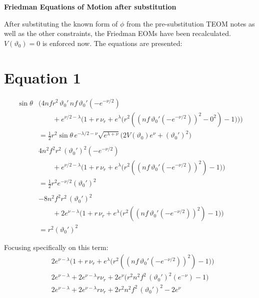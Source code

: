 \documentclass[12pt]{article}
\begin{document}
\begin{center}
  \Large\textbf{Friedman Equations of Motion after substitution} \\
  \large{}
\end{center}

After substituting the known form of $\phi$ from the pre-substitution TEOM notes as well as the other constraints, the Friedman EOMs have been recalculated. $V(\vartheta_0)=0$ is enforced now. The equations are presented:

\section*{Equation 1}

\begin{align*}
\sin\theta &\Big(
  4 n f r^2 \, \vartheta_0' 
  \, n f \, \vartheta_0' (- e^{-\nu/2}) \\
  & \qquad + e^{\nu/2 - \lambda} \Big(
      1 + r \, \nu_r + e^{\lambda} \big( r^2 ((n f \, \vartheta_0' (- e^{-\nu/2}))^2 - 0^2) - 1 \big)
    \Big)
\Big) \\
& = \frac{1}{2} r^2 \sin\theta \, e^{-\lambda/2 - \nu} \sqrt{e^{\lambda+\nu}} \Big( 2 V(\vartheta_0) e^{\nu} + (\vartheta_0')^2 \Big)  \\  \\
&4 n^2 f^2 r^2
  \, (\vartheta_0')^2 (- e^{-\nu/2})  \\
  & \qquad + e^{\nu/2 - \lambda} \Big(
      1 + r \, \nu_r + e^{\lambda} \big( r^2 ((n f \, \vartheta_0' (- e^{-\nu/2}))^2) - 1 \big)
    \Big) \\
& = \frac{1}{2} r^2 e^{-\nu/2} (\vartheta_0')^2  \\  \\
&-8 n^2 f^2 r^2
  \, (\vartheta_0')^2 \\
  & \qquad + 2e^{\nu - \lambda} \Big(
      1 + r \, \nu_r + e^{\lambda} \big( r^2 ((n f \, \vartheta_0' (- e^{-\nu/2}))^2) - 1 \big)
    \Big) \\
& = r^2 (\vartheta_0')^2 
\end{align*}

Focusing specifically on this term:
\begin{align*}
  &2e^{\nu - \lambda} \Big(
      1 + r \, \nu_r + e^{\lambda} \big( r^2 ((n f \, \vartheta_0' (- e^{-\nu/2}))^2) - 1 \big)
    \Big) \\
  &2e^{\nu - \lambda} + 2e^{\nu - \lambda}r \nu_r + 2e^{\nu} \big( r^2 n^2 f^2 \, (\vartheta_0')^2 (e^{-\nu}) - 1 \big) \\
  &2e^{\nu - \lambda} + 2e^{\nu - \lambda}r \nu_r + 2 r^2 n^2 f^2 \, (\vartheta_0')^2 - 2e^{\nu}
\end{align*}
\end{document}

